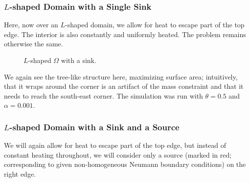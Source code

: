 \vfill\pagebreak

\subsubsection{$L$-shaped Domain with a Single Sink}

Here, now over an $L$-shaped domain, we allow for heat to escape part of the top edge. The interior is
also constantly and uniformly heated. The problem remains otherwise the same.

\begin{figure}[H]
    \centering
    \caption[b]{$L$-shaped $\Omega$ with a sink.}
\end{figure}

We again see the tree-like structure here, maximizing surface area; intuitively, that it wraps around the corner
is an artifact of the mass constraint and that it needs to reach the south-east corner. The simulation was run
with $\theta = 0.5$ and $\alpha = 0.001$.

\subsubsection{$L$-shaped Domain with a Sink and a Source}

We will again allow for heat to escape part of the top edge, but instead of constant heating throughout, we will
consider only a source (marked in red; corresponding to given non-homogeneous Neumann boundary conditions) on the right edge.

